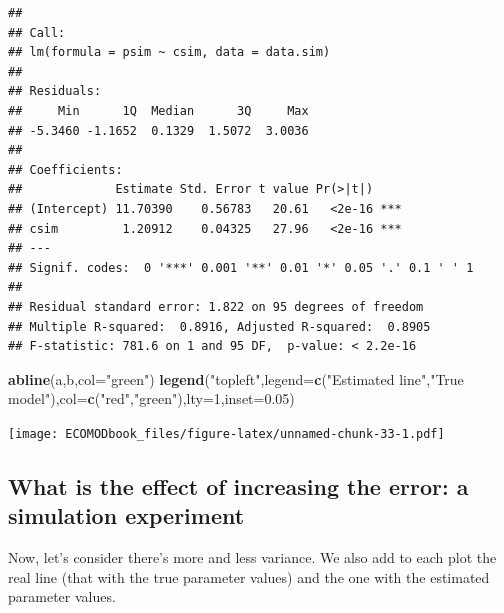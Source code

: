 \documentclass[
]{book}
\newenvironment{Shaded}{\begin{snugshade}}{\end{snugshade}}
\newcommand{\DataTypeTok}[1]{\textcolor[rgb]{0.13,0.29,0.53}{#1}}
\newcommand{\DecValTok}[1]{\textcolor[rgb]{0.00,0.00,0.81}{#1}}
\newcommand{\FloatTok}[1]{\textcolor[rgb]{0.00,0.00,0.81}{#1}}
\newcommand{\KeywordTok}[1]{\textcolor[rgb]{0.13,0.29,0.53}{\textbf{#1}}}
\newcommand{\NormalTok}[1]{#1}
\newcommand{\StringTok}[1]{\textcolor[rgb]{0.31,0.60,0.02}{#1}}
\begin{document}
\begin{verbatim}
## 
## Call:
## lm(formula = psim ~ csim, data = data.sim)
## 
## Residuals:
##     Min      1Q  Median      3Q     Max 
## -5.3460 -1.1652  0.1329  1.5072  3.0036 
## 
## Coefficients:
##             Estimate Std. Error t value Pr(>|t|)    
## (Intercept) 11.70390    0.56783   20.61   <2e-16 ***
## csim         1.20912    0.04325   27.96   <2e-16 ***
## ---
## Signif. codes:  0 '***' 0.001 '**' 0.01 '*' 0.05 '.' 0.1 ' ' 1
## 
## Residual standard error: 1.822 on 95 degrees of freedom
## Multiple R-squared:  0.8916,	Adjusted R-squared:  0.8905 
## F-statistic: 781.6 on 1 and 95 DF,  p-value: < 2.2e-16
\end{verbatim}

\begin{Shaded}
\begin{Highlighting}[]
\KeywordTok{abline}\NormalTok{(a,b,}\DataTypeTok{col=}\StringTok{"green"}\NormalTok{)}
\KeywordTok{legend}\NormalTok{(}\StringTok{"topleft"}\NormalTok{,}\DataTypeTok{legend=}\KeywordTok{c}\NormalTok{(}\StringTok{"Estimated line"}\NormalTok{,}\StringTok{"True model"}\NormalTok{),}\DataTypeTok{col=}\KeywordTok{c}\NormalTok{(}\StringTok{"red"}\NormalTok{,}\StringTok{"green"}\NormalTok{),}\DataTypeTok{lty=}\DecValTok{1}\NormalTok{,}\DataTypeTok{inset=}\FloatTok{0.05}\NormalTok{)}
\end{Highlighting}
\end{Shaded}

\texttt{[image: ECOMODbook\_files/figure-latex/unnamed-chunk-33-1.pdf]}

\hypertarget{what-is-the-effect-of-increasing-the-error-a-simulation-experiment}{%
\subsection{What is the effect of increasing the error: a simulation experiment}\label{what-is-the-effect-of-increasing-the-error-a-simulation-experiment}}

Now, let's consider there's more and less variance. We also add to each plot the real line (that with the true parameter values) and the one with the estimated parameter values.
\end{document}
